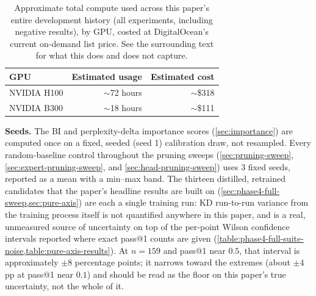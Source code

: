 \documentclass{article}
\theoremstyle{plain}
\theoremstyle{definition}
\theoremstyle{remark}
\begin{document}
\begin{table}[t]
\centering
\begin{tabular}{lrr}
\toprule
GPU & Estimated usage & Estimated cost \\
\midrule
NVIDIA H100 & $\sim$72 hours & $\sim$\$318 \\
NVIDIA B300 & $\sim$18 hours & $\sim$\$111 \\
\bottomrule
\end{tabular}
\caption{Approximate total compute used across this paper's entire
development history (all experiments, including negative results), by
GPU, costed at DigitalOcean's current on-demand list price. See the
surrounding text for what this does and does not capture.}
\label{table:compute-resources}
\end{table}

\textbf{Seeds.} The BI and perplexity-delta importance scores
(\cref{sec:importance}) are computed once on a fixed,
seeded (seed 1) calibration draw, not resampled. Every random-baseline
control throughout the pruning sweeps (\cref{sec:pruning-sweep},
\cref{sec:expert-pruning-sweep}, and \cref{sec:head-pruning-sweep}) uses 3 fixed seeds,
reported as a mean with a min--max band. The thirteen distilled,
retrained candidates that the paper's headline results are built on
(\cref{sec:phase4-full-sweep,sec:pure-axis}) are each a single
training run: KD run-to-run variance from the training process itself is
not quantified anywhere in this paper, and is a real, unmeasured source
of uncertainty on top of the per-point Wilson confidence intervals
reported where exact pass@1 counts are given
(\cref{table:phase4-full-suite-noise,table:pure-axis-results}). At
$n{=}159$ and pass@1 near $0.5$, that interval is approximately $\pm
8$ percentage points; it narrows toward the extremes (about $\pm 4$pp
at pass@1 near $0.1$) and should be read as the floor on this paper's
true uncertainty, not the whole of it.
\end{document}
